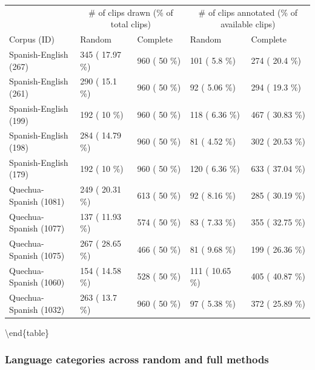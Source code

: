 \documentclass[
]{article}
\begin{document}
\begin{tabular}[t]{lllll}
\toprule
\multicolumn{1}{c}{ } & \multicolumn{2}{c}{\# of clips drawn (\% of total clips)} & \multicolumn{2}{c}{\# of clips annotated (\% of available clips)} \\
\cmidrule(l{3pt}r{3pt}){2-3} \cmidrule(l{3pt}r{3pt}){4-5}
Corpus (ID) & Random & Complete & Random & Complete\\
\midrule
Spanish-English (267) & 345 ( 17.97 \%) & 960 ( 50 \%) & 101 ( 5.8 \%) & 274 ( 20.4 \%)\\
Spanish-English (261) & 290 ( 15.1 \%) & 960 ( 50 \%) & 92 ( 5.06 \%) & 294 ( 19.3 \%)\\
Spanish-English (199) & 192 ( 10 \%) & 960 ( 50 \%) & 118 ( 6.36 \%) & 467 ( 30.83 \%)\\
Spanish-English (198) & 284 ( 14.79 \%) & 960 ( 50 \%) & 81 ( 4.52 \%) & 302 ( 20.53 \%)\\
Spanish-English (179) & 192 ( 10 \%) & 960 ( 50 \%) & 120 ( 6.36 \%) & 633 ( 37.04 \%)\\
\addlinespace
Quechua-Spanish (1081) & 249 ( 20.31 \%) & 613 ( 50 \%) & 92 ( 8.16 \%) & 285 ( 30.19 \%)\\
Quechua-Spanish (1077) & 137 ( 11.93 \%) & 574 ( 50 \%) & 83 ( 7.33 \%) & 355 ( 32.75 \%)\\
Quechua-Spanish (1075) & 267 ( 28.65 \%) & 466 ( 50 \%) & 81 ( 9.68 \%) & 199 ( 26.36 \%)\\
Quechua-Spanish (1060) & 154 ( 14.58 \%) & 528 ( 50 \%) & 111 ( 10.65 \%) & 405 ( 40.87 \%)\\
Quechua-Spanish (1032) & 263 ( 13.7 \%) & 960 ( 50 \%) & 97 ( 5.38 \%) & 372 ( 25.89 \%)\\
\bottomrule
\end{tabular}

\textbackslash end\{table\}

\hypertarget{language-categories-across-random-and-full-methods}{%
\subsubsection{Language categories across random and full methods}\label{language-categories-across-random-and-full-methods}}
\end{document}
